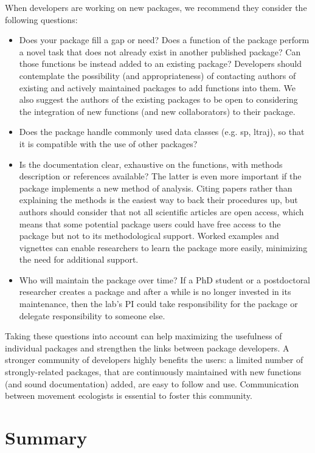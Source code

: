 \documentclass[a4paper,12pt]{article}
\begin{document}
When developers are working on new packages, we recommend they consider the following questions:
\begin{itemize}
	\item Does your package fill a gap or need? Does a function of the package perform a novel task that does not already exist in another published package? Can those functions be instead added to an existing package? Developers should contemplate the possibility (and appropriateness) of contacting authors of existing and actively maintained packages to add functions into them. We also suggest the authors of the existing packages to be open to considering the integration of new functions (and new collaborators) to their package.
	\item Does the package handle commonly used data classes (e.g. sp, ltraj), so that it is compatible with the use of other packages?
	\item Is the documentation clear, exhaustive on the functions, with methods description or references available? The latter is even more important if the package implements a new method of analysis. Citing papers rather than explaining the methods is the easiest way to back their procedures up, but authors should consider that not all scientific articles are open access, which means that some potential package users could have free access to the package but not to its methodological support. Worked examples and vignettes can enable researchers to learn the package more easily, minimizing the need for additional support.
	\item Who will maintain the package over time? If a PhD student or a postdoctoral researcher creates a package and after a while is no longer invested in its maintenance, then the lab's PI could take responsibility for the package or delegate responsibility to someone else. 
\end{itemize} 

Taking these questions into account can help maximizing the usefulness of individual packages and strengthen the links between package developers. A stronger community of developers  highly benefits the users: a limited number of strongly-related packages, that are continuously maintained with new functions (and sound documentation) added, are easy to follow and use. Communication between movement ecologists is essential to foster this community. 

\section*{Summary}
\end{document}
